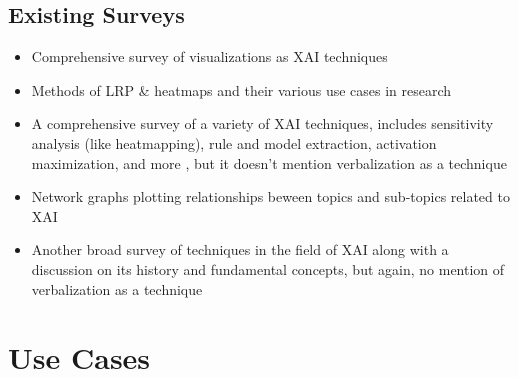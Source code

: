 \documentclass{IEEEtran}
\begin{document}
\subsection{Existing Surveys}
\begin{itemize}
    \item Comprehensive survey of visualizations as XAI techniques \cite{Hohman2018}
    \item Methods of LRP \& heatmaps and their various use cases in research\cite{MONTAVON20181}
    \item A comprehensive survey of a variety of XAI techniques, includes sensitivity analysis (like heatmapping), rule and model extraction, activation maximization, and more \cite{Guidotti:2018:SME:3271482.3236009}, but it doesn't mention verbalization as a technique
    \item Network graphs plotting relationships beween topics and sub-topics related to XAI \cite{Abdul:2018:TTE:3173574.3174156}
    \item Another broad survey of techniques in the field of XAI along with a discussion on its history and fundamental concepts, but again, no mention of verbalization as a technique\cite{Adadi2018}
\end{itemize}

\section{Use Cases} \label{UseCases}
\end{document}

